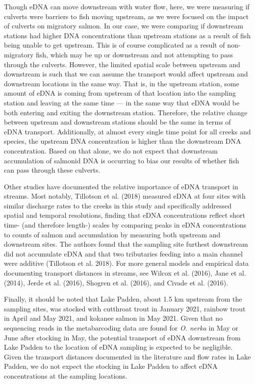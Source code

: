 \documentclass[
]{article}
\begin{document}
Though eDNA can move downstream with water flow, here, we were measuring
if culverts were barriers to fish moving upstream, as we were focused on
the impact of culverts on migratory salmon. In our case, we were
comparing if downstream stations had higher DNA concentrations than
upstream stations as a result of fish being unable to get upstream. This
is of course complicated as a result of non-migratory fish, which may be
up or downstream and not attempting to pass through the culverts.
However, the limited spatial scale between upstream and downstream is
such that we can assume the transport would affect upstream and
downstream locations in the same way. That is, in the upstream station,
some amount of eDNA is coming from upstream of that location into the
sampling station and leaving at the same time --- in the same way that
eDNA would be both entering and exiting the downstream station.
Therefore, the relative change between upstream and downstream stations
should be the same in terms of eDNA transport. Additionally, at almost
every single time point for all creeks and species, the upstream DNA
concentration is higher than the downstream DNA concentration. Based on
that alone, we do not expect that downstream accumulation of salmonid
DNA is occurring to bias our results of whether fish can pass through
these culverts.

Other studies have documented the relative importance of eDNA transport
in streams. Most notably, Tillotson et al. (2018) measured eDNA at four
sites with similar discharge rates to the creeks in this study and
specifically addressed spatial and temporal resolutions, finding that
eDNA concentrations reflect short time- (and therefore length-) scales
by comparing peaks in eDNA concentrations to counts of salmon and
accumulation by measuring both upstream and downstream sites. The
authors found that the sampling site furthest downstream did not
accumulate eDNA and that two tributaries feeding into a main channel
were additive (Tillotson et al. 2018). For more general models and
empirical data documenting transport distances in streams, see Wilcox et
al. (2016), Jane et al. (2014), Jerde et al. (2016), Shogren et al.
(2016), and Civade et al. (2016).

Finally, it should be noted that Lake Padden, about 1.5 km upstream from
the sampling sites, was stocked with cutthroat trout in January 2021,
rainbow trout in April and May 2021, and kokanee salmon in May 2021.
Given that no sequencing reads in the metabarcoding data are found for
\emph{O. nerka} in May or June after stocking in May, the potential
transport of eDNA downstream from Lake Padden to the location of eDNA
sampling is expected to be negligible. Given the transport distances
documented in the literature and flow rates in Lake Padden, we do not
expect the stocking in Lake Padden to affect eDNA concentrations at the
sampling locations.
\end{document}
